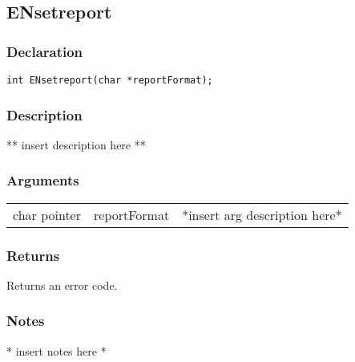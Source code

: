 \subsection{ENsetreport}
\subsubsection{Declaration}
\begin{lstlisting}
int ENsetreport(char *reportFormat);
\end{lstlisting}
\subsubsection{Description}
** insert description here **
\subsubsection{Arguments}
\begin{tabular}{l r p{11cm} }
char pointer&reportFormat&*insert arg description here* \\[6pt]
\end{tabular}
\subsubsection{Returns}
Returns an error code.
\subsubsection{Notes}
* insert notes here *